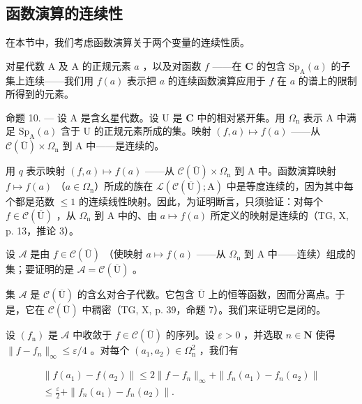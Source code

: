 \subsection{函数演算的连续性}

在本节中，我们考虑函数演算关于两个变量的连续性质。

对星代数 A 及 A 的正规元素 \(a\) ，以及对函数 \(f\) ——在 \(\mathbf{C}\) 的包含 \(\mathrm{Sp}_{\mathrm{A}}(a)\) 的子集上连续——我们用 \(f(a)\) 表示把 \(a\) 的连续函数演算应用于 \(f\) 在 \(a\) 的谱上的限制所得到的元素。

命题 10. --- 设 A 是含幺星代数。设 U 是 \(\mathbf{C}\) 中的相对紧开集。用 \(\Omega_{\mathrm{n}}\) 表示 A 中满足 \(\mathrm{Sp}_{\mathrm{A}}(a)\) 含于 U 的正规元素所成的集。映射 \((f,a)\mapsto f(a)\) ——从 \(\mathcal{C}(\overline{\mathrm{U}})\times \Omega_{\mathrm{n}}\) 到 A 中——是连续的。

用 \(q\) 表示映射 \((f, a) \mapsto f(a)\) ——从 \(\mathcal{C}(\overline{\mathrm{U}}) \times \Omega_{\mathrm{n}}\) 到 A 中。函数演算映射 \(f \mapsto f(a)\) （\(a \in \Omega_{\mathrm{n}}\)）所成的族在 \(\mathcal{L}(\mathcal{C}(\overline{\mathrm{U}}); \mathrm{A})\) 中是等度连续的，因为其中每个都是范数 \(\leqslant 1\) 的连续线性映射。因此，为证明断言，只须验证：对每个 \(f \in \mathcal{C}(\overline{\mathrm{U}})\) ，从 \(\Omega_{\mathrm{n}}\) 到 A 中的、由 \(a \mapsto f(a)\) 所定义的映射是连续的（TG, X, p. 13，推论 3）。

设 \(\mathcal{A}\) 是由 \(f\in\mathcal{C}(\overline{\mathrm{U}})\) （使映射 \(a\mapsto f(a)\) ——从 \(\Omega_{\mathrm{n}}\) 到 A 中——连续）组成的集；要证明的是 \(\mathcal{A}=\mathcal{C}(\overline{\mathrm{U}})\) 。

集 \(\mathcal{A}\) 是 \(\mathcal{C}(\overline{\mathrm{U}})\) 的含幺对合子代数。它包含 \(\overline{\mathrm{U}}\) 上的恒等函数，因而分离点。于是，它在 \(\mathcal{C}(\overline{\mathrm{U}})\) 中稠密（TG, X, p. 39，命题 7）。我们来证明它是闭的。

设 \((f_{\mathrm{n}})\) 是 \(\mathcal{A}\) 中收敛于 \(f \in \mathcal{C}(\overline{\mathrm{U}})\) 的序列。设 \(\varepsilon > 0\) ，并选取 \(n \in \mathbf{N}\) 使得 \(\|f - f_{n}\|_{\infty} \leqslant \varepsilon/4\) 。对每个 \((a_{1}, a_{2}) \in \Omega_{\mathrm{n}}^{2}\) ，我们有

\[
\begin{array}{c} \| f (a _ {1}) - f (a _ {2}) \| \leqslant 2 \| f - f _ {n} \| _ {\infty} + \| f _ {n} (a _ {1}) - f _ {n} (a _ {2}) \| \\ \leqslant \frac {\varepsilon}{2} + \| f _ {n} (a _ {1}) - f _ {n} (a _ {2}) \|. \end{array}
\]

